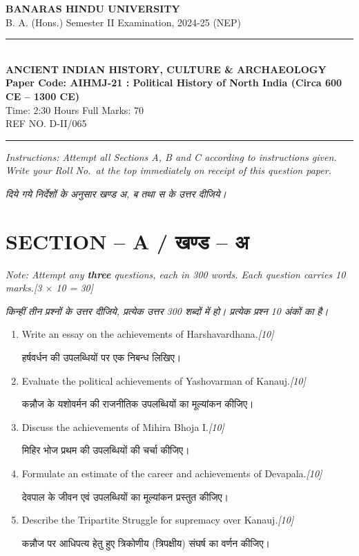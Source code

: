 \documentclass[11pt,a4paper]{article}
\newcommand{\pts}[1]{\hfill \textit{[#1]}}
\begin{document}
\begin{center}
  {\large\bfseries BANARAS HINDU UNIVERSITY}\\[2pt]
  {\normalsize B. A. (Hons.) Semester II Examination, 2024-25 (NEP)}\\[6pt]
  \rule{0.8\linewidth}{0.5pt}\\[6pt]
  {\large\bfseries ANCIENT INDIAN HISTORY, CULTURE \& ARCHAEOLOGY}\\[4pt]
  {\large\bfseries Paper Code: AIHMJ-21 : Political History of North India (Circa 600 CE -- 1300 CE)}\\[4pt]
  {\normalsize Time: 2:30 Hours \hfill Full Marks: 70}\\[2pt]
  {\small REF NO. D-II/065}
\end{center}
\rule{\linewidth}{0.4pt}
\smallskip

\noindent \textit{Instructions: Attempt all Sections A, B and C according to instructions given. Write your Roll No.\ at the top immediately on receipt of this question paper.}

\smallskip
\noindent \textit{दिये गये निर्देशों के अनुसार खण्ड अ, ब तथा स के उत्तर दीजिये।}

\bigskip

\section*{SECTION -- A / खण्ड -- अ}
\noindent \textit{Note: Attempt any \textbf{three} questions, each in 300 words. Each question carries 10 marks.}\pts{3 $\times$ 10 = 30}

\noindent \textit{किन्हीं तीन प्रश्नों के उत्तर दीजिये, प्रत्येक उत्तर 300 शब्दों में हो। प्रत्येक प्रश्न 10 अंकों का है।}

\begin{enumerate}[label=\textbf{\arabic*.},leftmargin=*,itemsep=12pt]

  \item Write an essay on the achievements of Harshavardhana.\pts{10}
  
  हर्षवर्धन की उपलब्धियों पर एक निबन्ध लिखिए।

  \item Evaluate the political achievements of Yashovarman of Kanauj.\pts{10}
  
  कन्नौज के यशोवर्मन की राजनीतिक उपलब्धियों का मूल्यांकन कीजिए।

  \item Discuss the achievements of Mihira Bhoja I.\pts{10}
  
  मिहिर भोज प्रथम की उपलब्धियों की चर्चा कीजिए।

  \item Formulate an estimate of the career and achievements of Devapala.\pts{10}
  
  देवपाल के जीवन एवं उपलब्धियों का मूल्यांकन प्रस्तुत कीजिए।

  \item Describe the Tripartite Struggle for supremacy over Kanauj.\pts{10}
  
  कन्नौज पर आधिपत्य हेतु हुए त्रिकोणीय (त्रिपक्षीय) संघर्ष का वर्णन कीजिए।

\end{enumerate}
\end{document}
